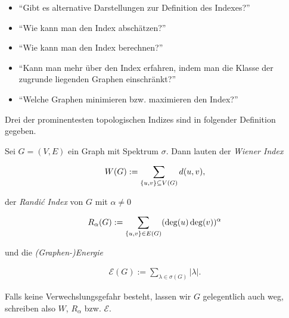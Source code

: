         \begin{itemize}
            \item \enquote{Gibt es alternative Darstellungen zur Definition des Indexes?}
            \item \enquote{Wie kann man den Index abschätzen?}
            \item \enquote{Wie kann man den Index berechnen?}
            \item \enquote{Kann man mehr über den Index erfahren, indem man die Klasse der zugrunde liegenden Graphen einschränkt?}
            \item \enquote{Welche Graphen minimieren bzw. maximieren den Index?}
        \end{itemize}

        Drei der prominentesten topologischen Indizes sind in folgender Definition gegeben.

        \begin{definition} \label{def:graph_indices}

            Sei $G = (V, E)$ ein Graph mit Spektrum $\sigma$.
            Dann lauten der \textit{Wiener Index}

            \begin{align*}
                W(G) := \sum_{\Bbraces{u, v} \subseteq V(G)} d(u, v), %
            \end{align*}

            der \textit{Randić Index} von $G$ mit $\alpha \neq 0$

            \begin{align*}
                R_\alpha(G)
                :=
                \sum_{{\left \{ u, v \right \}} \in E(G)} (\deg(u) \deg(v))^\alpha
            \end{align*}

            und die \textit{(Graphen-)Energie}

            \begin{align} \label{eq:graph_energy}
                \mathcal E(G)
                :=
                \sum_{\lambda \in \sigma(G)} |\lambda|.
            \end{align}

            Falls keine Verwechslungsgefahr besteht, lassen wir $G$ gelegentlich auch weg, schreiben also $W$, $R_\alpha$ bzw. $\mathcal E$.

        \end{definition}

